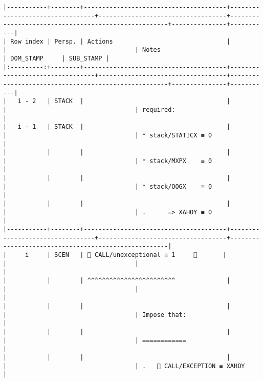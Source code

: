 \documentclass[varwidth=\maxdimen,margin=0.5cm,multi={verbatim}]{standalone}
\begin{document}
\begin{verbatim}
|-----------+--------+---------------------------------------+---------------------------------+-----------------------------------+-----------------------------------------------------+---------------+-----------|
| Row index | Persp. | Actions                               |                                 |                                   | Notes                                               | DOM_STAMP     | SUB_STAMP |
|:---------:+--------+---------------------------------------+---------------------------------+-----------------------------------+-----------------------------------------------------+---------------+-----------|
|   i - 2   | STACK  |                                       |                                 |                                   | required:                                           |
|   i - 1   | STACK  |                                       |                                 |                                   | * stack/STATICX ≡ 0                                 |
|           |        |                                       |                                 |                                   | * stack/MXPX    ≡ 0                                 |
|           |        |                                       |                                 |                                   | * stack/OOGX    ≡ 0                                 |
|           |        |                                       |                                 |                                   | .      => XAHOY ≡ 0                                 |
|-----------+--------+---------------------------------------+---------------------------------+-----------------------------------+-----------------------------------------------------|
|     i     | SCEN   |  CALL/unexceptional ≡ 1     👋       |                                 |                                   |                                                     |
|           |        | ^^^^^^^^^^^^^^^^^^^^^^^^              |                                 |                                   |                                                     |
|           |        |                                       |                                 |                                   | Impose that:                                        |
|           |        |                                       |                                 |                                   | ============                                        |
|           |        |                                       |                                 |                                   | .    CALL/EXCEPTION ≡ XAHOY                        |

\end{verbatim}
\end{document}
